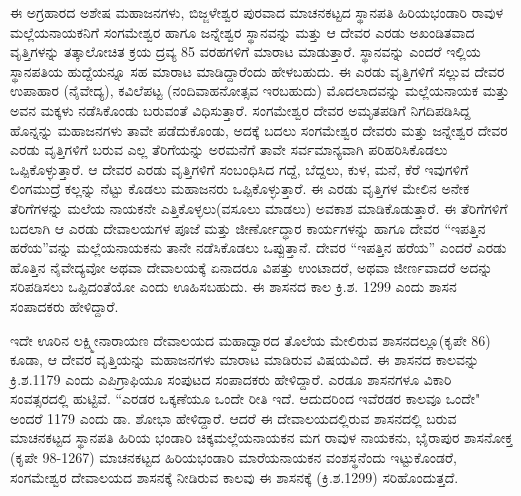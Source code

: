 ಈ ಅಗ್ರಹಾರದ ಅಶೇಷ ಮಹಾಜನಗಳು, ಬಿಜ್ಜಳೇಶ್ವರ ಪುರವಾದ ಮಾಚನಕಟ್ಟದ ಸ್ಥಾನಪತಿ ಹಿರಿಯಭಂಡಾರಿ ರಾವುಳ ಮಲ್ಲೆಯನಾಯಕನಿಗೆ ಸಂಗಮೇಶ್ವರ ಹಾಗೂ ಜನ್ನೇಶ್ವರ ಸ್ಥಾನವನ್ನು ಮತ್ತು ಆ ದೇವರ ಎರಡು ಅಖಂಡಿತವಾದ ವೃತ್ತಿಗಳನ್ನು ತತ್ಕಾಲೋಚಿತ ಕ್ರಯ ದ್ರವ್ಯ 85 ವರಹಗಳಿಗೆ ಮಾರಾಟ ಮಾಡುತ್ತಾರೆ. ಸ್ಥಾನವನ್ನು ಎಂದರೆ ಇಲ್ಲಿಯ ಸ್ಥಾನಪತಿಯ ಹುದ್ದೆಯನ್ನೂ ಸಹ ಮಾರಾಟ ಮಾಡಿದ್ದಾರೆಂದು ಹೇಳಬಹುದು. ಈ ಎರಡು ವೃತ್ತಿಗಳಿಗೆ ಸಲ್ಲುವ ದೇವರ ಉಪಾಹಾರ (ನೈವೇದ್ಯ), ಕವಿಲೆಪಟ್ಟ (ನಂದಿವಾಹನೋತ್ಸವ ಇರಬಹುದು) ಮೊದಲಾದವನ್ನು ಮಲ್ಲೆಯನಾಯಕ ಮತ್ತು ಅವನ ಮಕ್ಕಳು ನಡೆಸಿಕೊಂಡು ಬರುವಂತೆ ವಿಧಿಸುತ್ತಾರೆ. ಸಂಗಮೇಶ್ವರ ದೇವರ ಅಮೃತಪಡಿಗೆ ನಿಗದಿಪಡಿಸಿದ್ದ ಹೊನ್ನನ್ನು ಮಹಾಜನಗಳು ತಾವೇ ಪಡೆದುಕೊಂಡು, ಅದಕ್ಕೆ ಬದಲು ಸಂಗಮೇಶ್ವರ ದೇವರು ಮತ್ತು ಜನ್ನೇಶ್ವರ ದೇವರ ಎರಡು ವೃತ್ತಿಗಳಿಗೆ ಬರುವ ಎಲ್ಲ ತೆರಿಗೆಯನ್ನು ಅರಮನೆಗೆ ತಾವೇ ಸರ್ವಮಾನ್ಯವಾಗಿ ಪರಿಹರಿಸಿಕೊಡಲು ಒಪ್ಪಿಕೊಳ್ಳುತ್ತಾರೆ. ಆ ದೇವರ ಎರಡು ವೃತ್ತಿಗಳಿಗೆ ಸಂಬಂಧಿಸಿದ ಗದ್ದೆ, ಬೆದ್ದಲು, ಕುಳ, ಮನೆ, ಕೆರೆ ಇವುಗಳಿಗೆ ಲಿಂಗಮುದ್ರೆ ಕಲ್ಲನ್ನು ನೆಟ್ಟು ಕೊಡಲು ಮಹಾಜನರು ಒಪ್ಪಿಕೊಳ್ಳುತ್ತಾರೆ. ಈ ಎರಡು ವೃತ್ತಿಗಳ ಮೇಲಿನ ಅನೇಕ ತೆರಿಗೆಗಳನ್ನು ಮಲೆಯ ನಾಯಕನೇ ಎತ್ತಿಕೊಳ್ಳಲು(ವಸೂಲು ಮಾಡಲು) ಅವಕಾಶ ಮಾಡಿಕೊಡುತ್ತಾರೆ. ಈ ತೆರಿಗೆಗಳಿಗೆ ಬದಲಾಗಿ ಆ ಎರಡು ದೇವಾಲಯಗಳ ಪೂಜೆ ಮತ್ತು ಜೀರ್ಣೋದ್ಧಾರ ಕಾರ್ಯಗಳನ್ನು ಹಾಗೂ ದೇವರ “ಇಪತ್ತಿನ ಹರೆಯ”ವನ್ನು ಮಲ್ಲೆಯನಾಯಕನು ತಾನೇ ನಡೆಸಿಕೊಡಲು ಒಪ್ಪುತ್ತಾನೆ. ದೇವರ “ಇಪತ್ತಿನ ಹರೆಯ” ಎಂದರೆ ಎರಡು ಹೊತ್ತಿನ ನೈವೇದ್ಯವೋ ಅಥವಾ ದೇವಾಲಯಕ್ಕೆ ಏನಾದರೂ ವಿಪತ್ತು ಉಂಟಾದರೆ, ಅಥವಾ ಜೀರ್ಣವಾದರೆ ಅದನ್ನು ಸರಿಪಡಿಸಲು ಒಪ್ಪಿದಂತೆಯೋ ಎಂದು ಊಹಿಸಬಹುದು. ಈ ಶಾಸನದ ಕಾಲ ಕ್ರಿ.ಶ. 1299 ಎಂದು ಶಾಸನ ಸಂಪಾದಕರು ಹೇಳಿದ್ದಾರೆ.

ಇದೇ ಊರಿನ ಲಕ್ಷ್ಮೀನಾರಾಯಣ ದೇವಾಲಯದ ಮಹಾದ್ವಾರದ ತೊಲೆಯ ಮೇಲಿರುವ ಶಾಸನದಲ್ಲೂ(ಕೃಪೇ 86) ಕೂಡಾ, ಆ ದೇವರ ವೃತ್ತಿಯನ್ನು ಮಹಾಜನಗಳು ಮಾರಾಟ ಮಾಡಿರುವ ವಿಷಯವಿದೆ. ಈ ಶಾಸನದ ಕಾಲವನ್ನು ಕ್ರಿ.ಶ.1179 ಎಂದು ಎಪಿಗ್ರಾಫಿಯೂ ಸಂಪುಟದ ಸಂಪಾದಕರು ಹೇಳಿದ್ದಾರೆ. ಎರಡೂ ಶಾಸನಗಳೂ ವಿಕಾರಿ ಸಂವತ್ಸರದಲ್ಲಿ ಹುಟ್ಟಿವೆ. “ಎರಡರ ಒಕ್ಕಣೆಯೂ ಒಂದೇ ರೀತಿ ಇದೆ. ಆದುದರಿಂದ ಇವೆರಡರ ಕಾಲವೂ ಒಂದೇ" ಅಂದರೆ 1179 ಎಂದು ಡಾ. ಶೋಭಾ ಹೇಳಿದ್ದಾರೆ. ಆದರೆ ಈ ದೇವಾಲಯದಲ್ಲಿರುವ ಶಾಸನದಲ್ಲಿ ಬರುವ ಮಾಚನಕಟ್ಟದ ಸ್ಥಾನಪತಿ ಹಿರಿಯ ಭಂಡಾರಿ ಚಿಕ್ಕಮಲ್ಲೆಯನಾಯಕನ ಮಗ ರಾವುಳ ನಾಯಕನು, ಭೈರಾಪುರ ಶಾಸನೋಕ್ತ (ಕೃಪೇ 98-1267) ಮಾಚನಕಟ್ಟದ ಹಿರಿಯಭಂಡಾರಿ ಮಾರೆಯನಾಯಕನ ವಂಶಸ್ಥನೆಂದು ಇಟ್ಟುಕೊಂಡರೆ, ಸಂಗಮೇಶ್ವರ ದೇವಾಲಯದ ಶಾಸನಕ್ಕೆ ನೀಡಿರುವ ಕಾಲವು ಈ ಶಾಸನಕ್ಕೆ (ಕ್ರಿ.ಶ.1299) ಸರಿಹೊಂದುತ್ತದೆ.

